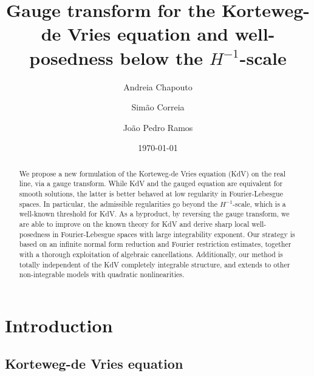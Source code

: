 \documentclass[%
11pt,  reqno]{amsart}
\title[Gauge transform for KdV]{Gauge transform for the Korteweg-de Vries equation and well-posedness below the $H^{-1}$-scale}
\author[A.~Chapouto \and S.~Correia \and J.~P.~Ramos]
{Andreia Chapouto \and Sim\~ao Correia \and Jo\~ao Pedro Ramos}
\date{\today}
\newcommand{\5}{\textup{V}}
\theoremstyle{remark}
\numberwithin{equation}{section}
\numberwithin{theorem}{section}
\begin{document}
\begin{abstract}



We propose a new formulation of the Korteweg-de Vries equation (KdV) on the real line, via a gauge transform.
While KdV and the gauged equation are equivalent for smooth solutions, the latter is better behaved at low regularity in Fourier-Lebesgue spaces. In particular, the admissible regularities go beyond the $H^{-1}$-scale, which is a well-known threshold for KdV. As a byproduct, by reversing the gauge transform, we are able to improve on the known theory for KdV and derive sharp local well-posedness in Fourier-Lebesgue spaces with large integrability exponent.
% 
Our strategy is based on an infinite normal form reduction and Fourier restriction estimates, together with a thorough exploitation of algebraic cancellations. Additionally, our method is totally independent of the KdV completely integrable structure, and extends to other non-integrable models with quadratic nonlinearities. 


\end{abstract}
    
	\maketitle
	
	

    
    \section{Introduction}


    \subsection{Korteweg-de Vries equation}
\end{document}
